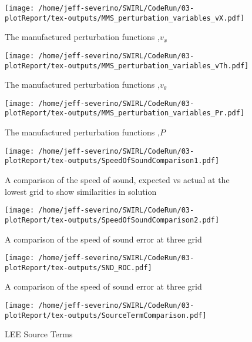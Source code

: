 \documentclass[a4paper]{article}
\begin{document}
\begin{figure}[!]
    \centering
    \texttt{[image: /home/jeff-severino/SWIRL/CodeRun/03-plotReport/tex-outputs/MMS\_perturbation\_variables\_vX.pdf]}
\caption{The manufactured perturbation functions ,$v_x$}%
    \label{fig:2a}
\end{figure}


\begin{figure}[!]
    \centering
    \texttt{[image: /home/jeff-severino/SWIRL/CodeRun/03-plotReport/tex-outputs/MMS\_perturbation\_variables\_vTh.pdf]}
    \caption{The manufactured perturbation functions ,$v_{\theta}$}%
    \label{fig:3a}
\end{figure}


\begin{figure}[!]
    \centering
    \texttt{[image: /home/jeff-severino/SWIRL/CodeRun/03-plotReport/tex-outputs/MMS\_perturbation\_variables\_Pr.pdf]}
\caption{The manufactured perturbation functions ,$P$}%
    \label{fig:4a}
\end{figure}

\begin{figure}[!]
    \centering
    \texttt{[image: /home/jeff-severino/SWIRL/CodeRun/03-plotReport/tex-outputs/SpeedOfSoundComparison1.pdf]}
    \caption{ A comparison of the speed of sound, expected vs actual at the lowest grid to show similarities in solution}
    \label{fig:5}
\end{figure}


\begin{figure}[!]
    \centering
    \texttt{[image: /home/jeff-severino/SWIRL/CodeRun/03-plotReport/tex-outputs/SpeedOfSoundComparison2.pdf]}
    \caption{ A comparison of the speed of sound error at three grid}
    \label{fig:5a}
\end{figure}


\begin{figure}[!]
    \centering
    \texttt{[image: /home/jeff-severino/SWIRL/CodeRun/03-plotReport/tex-outputs/SND\_ROC.pdf]}
    \caption{ A comparison of the speed of sound error at three grid}
    \label{fig:5a}
\end{figure}



\begin{figure}[!]
    \centering
    \texttt{[image: /home/jeff-severino/SWIRL/CodeRun/03-plotReport/tex-outputs/SourceTermComparison.pdf]}
    \caption{LEE Source Terms}
    \label{fig:6}
\end{figure}
\end{document}
